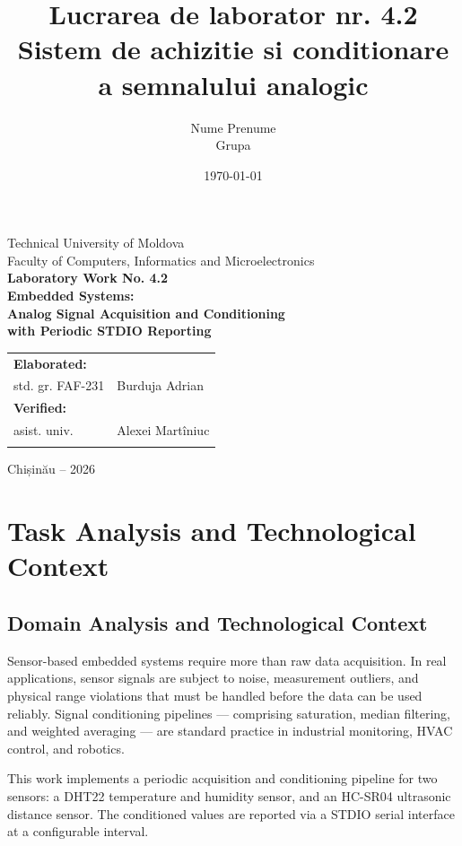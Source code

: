 \documentclass[12pt,a4paper]{article}
\title{Lucrarea de laborator nr. 4.2\\
Sistem de achizitie si conditionare a semnalului analogic}
\author{Nume Prenume\\Grupa}
\date{\today}
\begin{document}
\begin{titlepage}
\begin{center}
\vspace*{1cm}
{\Large Technical University of Moldova}\\[0.5cm]
{\Large Faculty of Computers, Informatics and Microelectronics}\\[2cm]
{\Huge\bfseries Laboratory Work No. 4.2}\\[1cm]
{\Large\bfseries Embedded Systems:\\
Analog Signal Acquisition and Conditioning\\
with Periodic STDIO Reporting}\\[3.5cm]
\begin{flushright}
\begin{tabular}{ll}
\textbf{Elaborated:} & \\
std. gr. FAF-231 & Burduja Adrian \\[1cm]
\textbf{Verified:} & \\
asist. univ. & Alexei Martîniuc \\ & \\
\end{tabular}
\end{flushright}
\vfill
{\Large Chișinău -- 2026}
\end{center}
\end{titlepage}
\newpage

\section{Task Analysis and Technological Context}

\subsection{Domain Analysis and Technological Context}
Sensor-based embedded systems require more than raw data acquisition. In real applications,
sensor signals are subject to noise, measurement outliers, and physical range violations that
must be handled before the data can be used reliably. Signal conditioning pipelines — comprising
saturation, median filtering, and weighted averaging — are standard practice in industrial
monitoring, HVAC control, and robotics.

This work implements a periodic acquisition and conditioning pipeline for two sensors:
a DHT22 temperature and humidity sensor, and an HC-SR04 ultrasonic distance sensor.
The conditioned values are reported via a STDIO serial interface at a configurable interval.
\end{document}
